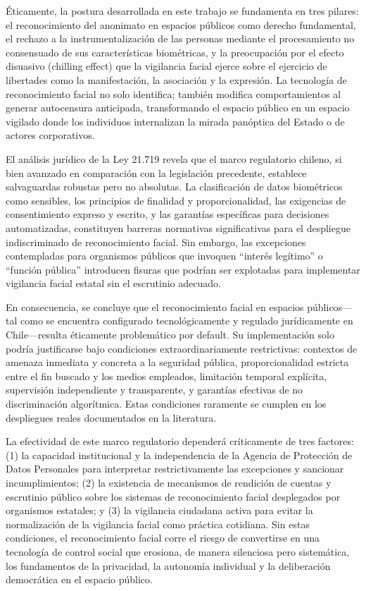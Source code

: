 \documentclass[11pt, a4paper]{article}
\begin{document}
Éticamente, la postura desarrollada en este trabajo se fundamenta en tres pilares: el reconocimiento del anonimato en espacios públicos como derecho fundamental, el rechazo a la instrumentalización de las personas mediante el procesamiento no consensuado de sus características biométricas, y la preocupación por el efecto disuasivo (chilling effect) que la vigilancia facial ejerce sobre el ejercicio de libertades como la manifestación, la asociación y la expresión. La tecnología de reconocimiento facial no solo identifica; también modifica comportamientos al generar autocensura anticipada, transformando el espacio público en un espacio vigilado donde los individuos internalizan la mirada panóptica del Estado o de actores corporativos.

El análisis jurídico de la Ley 21.719 revela que el marco regulatorio chileno, si bien avanzado en comparación con la legislación precedente, establece salvaguardas robustas pero no absolutas. La clasificación de datos biométricos como sensibles, los principios de finalidad y proporcionalidad, las exigencias de consentimiento expreso y escrito, y las garantías específicas para decisiones automatizadas, constituyen barreras normativas significativas para el despliegue indiscriminado de reconocimiento facial. Sin embargo, las excepciones contempladas para organismos públicos que invoquen ``interés legítimo'' o ``función pública'' introducen fisuras que podrían ser explotadas para implementar vigilancia facial estatal sin el escrutinio adecuado.

En consecuencia, se concluye que el reconocimiento facial en espacios públicos---tal como se encuentra configurado tecnológicamente y regulado jurídicamente en Chile---resulta éticamente problemático por default. Su implementación solo podría justificarse bajo condiciones extraordinariamente restrictivas: contextos de amenaza inmediata y concreta a la seguridad pública, proporcionalidad estricta entre el fin buscado y los medios empleados, limitación temporal explícita, supervisión independiente y transparente, y garantías efectivas de no discriminación algorítmica. Estas condiciones raramente se cumplen en los despliegues reales documentados en la literatura.

La efectividad de este marco regulatorio dependerá críticamente de tres factores: (1) la capacidad institucional y la independencia de la Agencia de Protección de Datos Personales para interpretar restrictivamente las excepciones y sancionar incumplimientos; (2) la existencia de mecanismos de rendición de cuentas y escrutinio público sobre los sistemas de reconocimiento facial desplegados por organismos estatales; y (3) la vigilancia ciudadana activa para evitar la normalización de la vigilancia facial como práctica cotidiana. Sin estas condiciones, el reconocimiento facial corre el riesgo de convertirse en una tecnología de control social que erosiona, de manera silenciosa pero sistemática, los fundamentos de la privacidad, la autonomía individual y la deliberación democrática en el espacio público.
\end{document}
